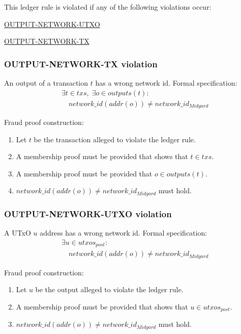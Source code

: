 \documentclass[../midgard.tex]{subfiles}
\begin{document}
This ledger rule is violated if any of the following violations occur:
\begin{itemize-multi}
  \item \hyperref[violation:OUTPUT-NETWORK-UTXO]{OUTPUT-NETWORK-UTXO}
  \item \hyperref[violation:OUTPUT-NETWORK-TX]{OUTPUT-NETWORK-TX}
\end{itemize-multi}

\subsubsection{OUTPUT-NETWORK-TX violation}
\label{violation:OUTPUT-NETWORK-TX}
An output of a transaction $t$ has a wrong network id.
Formal specification:
\begin{equation*}
\begin{split}
  &\exists t \in txs,\; \exists o \in outputs(t):\\
    &\quad network\_id(addr(o)) \neq network\_id_{Midgard}
\end{split}
\end{equation*}

Fraud proof construction:
\begin{enumerate}
  \item Let $t$ be the transaction alleged to violate the ledger rule. 
  \item A membership proof must be provided that shows that $t \in txs$.
  \item A membership proof must be provided that $o \in outputs(t)$.
  \item $network\_id(addr(o)) \neq network\_id_{Midgard}$ must hold.
\end{enumerate}

\subsubsection{OUTPUT-NETWORK-UTXO violation}
\label{violation:OUTPUT-NETWORK-UTXO}
A UTxO $u$ address has a wrong network id.
Formal specification:
\begin{equation*}
\begin{split}
  &\exists u \in utxos_{post}:\\
    &\quad network\_id(addr(o)) \neq network\_id_{Midgard}
\end{split}
\end{equation*}

Fraud proof construction:
\begin{enumerate}
  \item Let $u$ be the output alleged to violate the ledger rule.
  \item A membership proof must be provided that shows that $u \in utxos_{post}$.
  \item $network\_id(addr(o)) \neq network\_id_{Midgard}$ must hold.
\end{enumerate}
\end{document}
